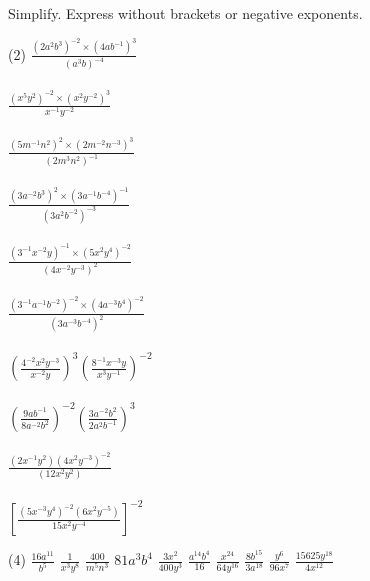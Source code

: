 \documentclass[12pt,fleqn]{book}
\newcommand{\prb}[1]{\begin{Exercise}#1\end{Exercise}}
\newcommand{\sol}[1]{\begin{Answer}#1\end{Answer}}
\begin{document}
\prb{
    Simplify. Express without brackets or negative exponents.\\
    \begin{tasks}(2)
        \task $\displaystyle \frac{\left(2 a^{2} b^{3}\right)^{-2} \times\left(4 a b^{-1}\right)^{3}}{\left(a^{3} b\right)^{-4}}$\\
        \\[1.5in]
        \task $\displaystyle\frac{\left(x^{5} y^{2}\right)^{-2} \times\left(x^{2} y^{-2}\right)^{3}}{x^{-1} y^{-2}}$\\
        \\[1.5in]
        \task $\displaystyle\frac{\left(5 m^{-1} n^{2}\right)^{2} \times\left(2 m^{-2} n^{-3}\right)^{3}}{\left(2 m^{3} n^{2}\right)^{-1}}$\\
        \\[1.5in]
        \task $\displaystyle\frac{\left(3 a^{-2} b^{3}\right)^{2} \times\left(3 a^{-1} b^{-4}\right)^{-1}}{\left(3 a^{2} b^{-2}\right)^{-3}}$\\
        \\[1.5in]
        \task $\displaystyle\frac{\left(3^{-1} x^{-2} y\right)^{-1} \times\left(5 x^{2} y^{4}\right)^{-2}}{\left(4 x^{-2} y^{-3}\right)^{2}}$\\
        \\[1.5in]
        \task $\displaystyle\frac{\left(3^{-1} a^{-1} b^{-2}\right)^{-2} \times\left(4 a^{-3} b^{4}\right)^{-2}}{\left(3 a^{-3} b^{-4}\right)^{2}}$\\
        \\[1.5in]
        \task $\displaystyle\left(\frac{4^{-2} x^{2} y^{-3}}{x^{-2} y}\right)^{3}\left(\frac{8^{-1} x^{-3} y}{x^{3} y^{-1}}\right)^{-2}$\\
        \\[1.5in]
        \task $\displaystyle\left(\frac{9 a b^{-1}}{8 a^{-2} b^{2}}\right)^{-2}\left(\frac{3 a^{-2} b^{2}}{2 a^{2} b^{-1}}\right)^{3}$\\
        \\[1.5in]
        \task $\displaystyle\frac{\left(2 x^{-1} y^{2}\right)\left(4 x^{2} y^{-3}\right)^{-2}}{\left(12 x^{2} y^{2}\right)}$\\
        \\[1.5in]
        \task $\displaystyle\left[\frac{\left(5 x^{-3} y^{4}\right)^{-2}\left(6 x^{2} y^{-5}\right)}{15 x^{2} y^{-4}}\right]^{-2}$
        \\[1.5in]
    \end{tasks}
}
\sol{
    \begin{tasks}(4)
\task $\frac{16 a^{11}}{b^5}$
\task $\frac{1}{x^3 y^8}$
\task $\frac{400}{m^5 n^3}$
\task $81 a^3 b^4$
\task $\frac{3 x^2}{400 y^3}$
\task $\frac{a^{14} b^4}{16}$
\task $\frac{x^{24}}{64 y^{16}}$
\task $\frac{8 b^{15}}{3 a^{18}}$
\task $\frac{y^6}{96 x^7}$
\task $\frac{15625 y^{18}}{4 x^{12}}$
    \end{tasks}
}
\end{document}
